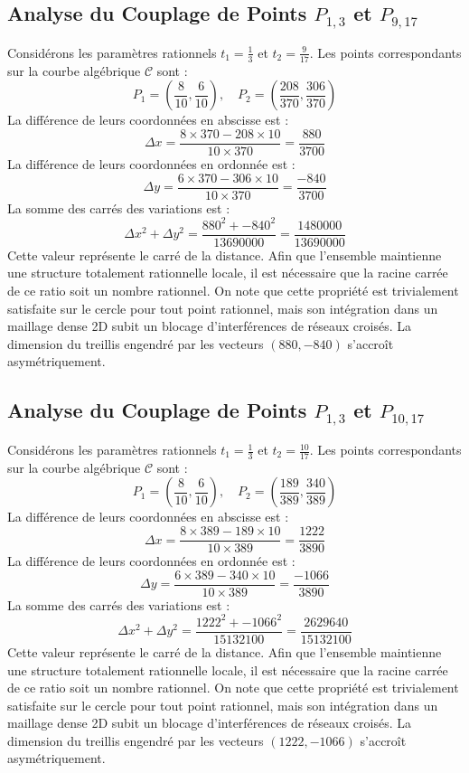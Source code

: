\documentclass[12pt, a4paper]{article}
\begin{document}
\subsection{Analyse du Couplage de Points $P_{1,3}$ et $P_{9,17}$}
Considérons les paramètres rationnels $t_1 = \frac{1}{3}$ et $t_2 = \frac{9}{17}$.
Les points correspondants sur la courbe algébrique $\mathcal{C}$ sont :
$$ P_1 = \left( \frac{8}{10}, \frac{6}{10} \right), \quad P_2 = \left( \frac{208}{370}, \frac{306}{370} \right) $$
La différence de leurs coordonnées en abscisse est :
$$ \Delta x = \frac{8 \times 370 - 208 \times 10}{10 \times 370} = \frac{880}{3700} $$
La différence de leurs coordonnées en ordonnée est :
$$ \Delta y = \frac{6 \times 370 - 306 \times 10}{10 \times 370} = \frac{-840}{3700} $$
La somme des carrés des variations est :
$$ \Delta x^2 + \Delta y^2 = \frac{ 880^2 + -840^2 }{ 13690000 } = \frac{ 1480000 }{ 13690000 } $$
Cette valeur représente le carré de la distance. Afin que l'ensemble maintienne une structure totalement rationnelle locale, il est nécessaire que la racine carrée de ce ratio soit un nombre rationnel. On note que cette propriété est trivialement satisfaite sur le cercle pour tout point rationnel, mais son intégration dans un maillage dense 2D subit un blocage d'interférences de réseaux croisés. La dimension du treillis engendré par les vecteurs $( 880, -840 )$ s'accroît asymétriquement.


\subsection{Analyse du Couplage de Points $P_{1,3}$ et $P_{10,17}$}
Considérons les paramètres rationnels $t_1 = \frac{1}{3}$ et $t_2 = \frac{10}{17}$.
Les points correspondants sur la courbe algébrique $\mathcal{C}$ sont :
$$ P_1 = \left( \frac{8}{10}, \frac{6}{10} \right), \quad P_2 = \left( \frac{189}{389}, \frac{340}{389} \right) $$
La différence de leurs coordonnées en abscisse est :
$$ \Delta x = \frac{8 \times 389 - 189 \times 10}{10 \times 389} = \frac{1222}{3890} $$
La différence de leurs coordonnées en ordonnée est :
$$ \Delta y = \frac{6 \times 389 - 340 \times 10}{10 \times 389} = \frac{-1066}{3890} $$
La somme des carrés des variations est :
$$ \Delta x^2 + \Delta y^2 = \frac{ 1222^2 + -1066^2 }{ 15132100 } = \frac{ 2629640 }{ 15132100 } $$
Cette valeur représente le carré de la distance. Afin que l'ensemble maintienne une structure totalement rationnelle locale, il est nécessaire que la racine carrée de ce ratio soit un nombre rationnel. On note que cette propriété est trivialement satisfaite sur le cercle pour tout point rationnel, mais son intégration dans un maillage dense 2D subit un blocage d'interférences de réseaux croisés. La dimension du treillis engendré par les vecteurs $( 1222, -1066 )$ s'accroît asymétriquement.
\end{document}
